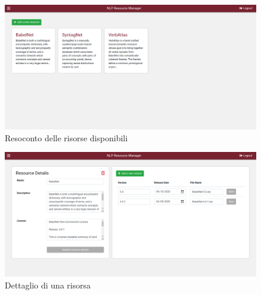 \begin{figure}[H]
	\centering
	\includegraphics[width=\textwidth]{assets/ui/resources-list.png}
	\caption{Resoconto delle risorse disponibili}
	\label{fig:resources-list}
\end{figure}

\begin{figure}[H]
	\centering
	\includegraphics[width=\textwidth]{assets/ui/resource-details.png}
	\caption{Dettaglio di una risorsa}
	\label{fig:resource-details}
\end{figure}